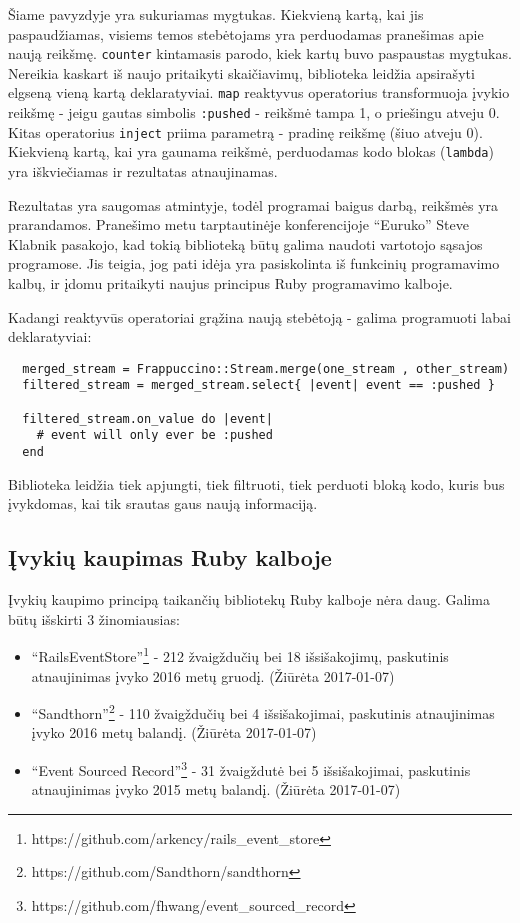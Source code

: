 Šiame pavyzdyje yra sukuriamas mygtukas. Kiekvieną kartą, kai jis paspaudžiamas, visiems temos stebėtojams yra perduodamas pranešimas apie naują reikšmę. \lstinline|counter| kintamasis parodo, kiek kartų buvo paspaustas mygtukas. Nereikia kaskart iš naujo pritaikyti skaičiavimų, biblioteka leidžia apsirašyti elgseną vieną kartą deklaratyviai. \lstinline|map| reaktyvus operatorius transformuoja įvykio reikšmę - jeigu gautas simbolis \lstinline|:pushed| - reikšmė tampa 1, o priešingu atveju 0. Kitas operatorius \lstinline|inject| priima parametrą - pradinę reikšmę (šiuo atveju 0). Kiekvieną kartą, kai yra gaunama reikšmė, perduodamas kodo blokas (\lstinline|lambda|) yra iškviečiamas ir rezultatas atnaujinamas.

Rezultatas yra saugomas atmintyje, todėl programai baigus darbą, reikšmės yra prarandamos. Pranešimo metu tarptautinėje konferencijoje ``Euruko'' Steve Klabnik pasakojo, kad tokią biblioteką būtų galima naudoti vartotojo sąsajos programose. Jis teigia, jog pati idėja yra pasiskolinta iš funkcinių programavimo kalbų, ir įdomu pritaikyti naujus principus Ruby programavimo kalboje.

Kadangi reaktyvūs operatoriai grąžina naują stebėtoją - galima programuoti labai deklaratyviai:

\begin{lstlisting}
  merged_stream = Frappuccino::Stream.merge(one_stream , other_stream)
  filtered_stream = merged_stream.select{ |event| event == :pushed }

  filtered_stream.on_value do |event|
    # event will only ever be :pushed
  end
\end{lstlisting}

Biblioteka leidžia tiek apjungti, tiek filtruoti, tiek perduoti bloką kodo, kuris bus įvykdomas, kai tik srautas gaus naują informaciją.

\subsection{Įvykių kaupimas Ruby kalboje}

Įvykių kaupimo principą taikančių bibliotekų Ruby kalboje nėra daug. Galima būtų išskirti 3 žinomiausias:

\begin{itemize}
  \item ``RailsEventStore''\footnote{https://github.com/arkency/rails\_event\_store} - 212 žvaigždučių bei 18 išsišakojimų, paskutinis atnaujinimas įvyko 2016 metų gruodį. (Žiūrėta 2017-01-07)

  \item ``Sandthorn''\footnote{https://github.com/Sandthorn/sandthorn} - 110 žvaigždučių bei 4 išsišakojimai, paskutinis atnaujinimas įvyko 2016 metų balandį. (Žiūrėta 2017-01-07)

  \item ``Event Sourced Record''\footnote{https://github.com/fhwang/event\_sourced\_record} - 31 žvaigždutė bei 5 išsišakojimai, paskutinis atnaujinimas įvyko 2015 metų balandį. (Žiūrėta 2017-01-07)
\end{itemize}

